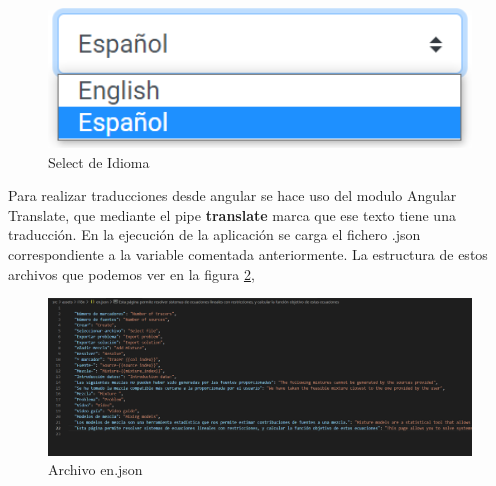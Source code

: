 \begin{figure}[h!] 
\centering
    \includegraphics[width=1\textwidth]{img/selectIdiom.PNG}
\caption{Select de Idioma}
\label{fig:selectidiom}
\end{figure}

Para realizar traducciones desde angular se hace uso del modulo Angular Translate, que mediante el pipe \textbf{translate} marca que ese texto tiene una traducción. En la ejecución de la aplicación se carga el fichero .json correspondiente a la variable comentada anteriormente. La estructura de estos archivos que podemos ver en la figura \ref{fig:en_json}, 

\begin{figure}[h!] 
\centering
    \includegraphics[width=1\textwidth]{img/en_json.PNG}
\caption{Archivo en.json}
\label{fig:en_json}
\end{figure}








